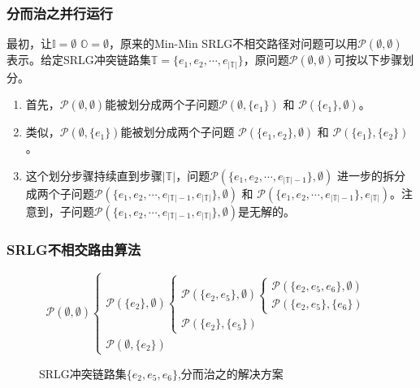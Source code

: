 \begin{frame}
\frametitle{分而治之并行运行}
最初，让$\mathbb{I}=\emptyset$ ${\mathbb{O}}=\emptyset$，原来的Min-Min SRLG不相交路径对问题可以用$\mathcal{P}(\emptyset,\emptyset)$ 表示。给定SRLG冲突链路集$\mathbb{T}=\{{e_1},{e_2}, \cdots ,{e_{\left| \mathbb{T} \right|}}\}$，原问题$\mathcal{P}(\emptyset,\emptyset)$可按以下步骤划分。

\begin{enumerate}
  \item 首先，$\mathcal{P}(\emptyset,\emptyset)$能被划分成两个子问题$\mathcal{P}(\emptyset,\{e_1\})$ 和 $\mathcal{P}(\{e_1\},\emptyset)$。
  \item 类似，$\mathcal{P}(\emptyset,\{e_1\})$能被划分成两个子问题 $\mathcal{P}(\{e_1,e_2\},\emptyset)$ 和 $\mathcal{P}(\{e_1\},\{e_2\})$。
  \item 这个划分步骤持续直到步骤$|\mathbb{T}|$，问题$\mathcal{P}(\{e_1,e_2,\cdots ,{e_{\left| \mathbb{T} \right|-1}}\},\emptyset)$ 进一步的拆分成两个子问题$\mathcal{P}(\{e_1,e_2,\cdots ,{e_{\left| \mathbb{T} \right|-1}}, {e_{\left| \mathbb{T} \right|}}\},\emptyset)$ 和 $\mathcal{P}(\{e_1,e_2,\cdots ,{e_{\left| \mathbb{T} \right|-1}}\},{e_{\left| \mathbb{T} \right|}})$。注意到，子问题$\mathcal{P}(\{e_1,e_2,\cdots ,{e_{\left| \mathbb{T} \right|-1}}, {e_{\left| \mathbb{T} \right|}}\},\emptyset)$是无解的。
\end{enumerate}

\end{frame}
\begin{frame}
\frametitle{SRLG不相交路由算法}
\begin{figure}[htbp]
\large{
\begin{equation*}
{\mathcal P}(\emptyset ,\emptyset )\left\{ {\begin{array}{*{20}{l}}
{{\mathcal P}(\{ e_2\} ,\emptyset )\left\{ {\begin{array}{*{20}{l}}
{{\mathcal P}(\{ e_2,e_5\} ,\emptyset )\left\{ {\begin{array}{*{20}{l}}
{{\mathcal P}(\{ e_2,e_5,e_6\} ,\emptyset )}\\
{\boxed{{\mathcal P}(\{ e_2,e_5\} ,\{ e_6\} )}}
\end{array}} \right.}\\
{\boxed{{\mathcal P}(\{ e_2\} ,\{ e_5\} )}}
\end{array}} \right.}\\
{\boxed{{\mathcal P}(\emptyset ,\{ e_2\} )}}
\end{array}} \right.
\end{equation*}
}
\caption{SRLG冲突链路集$\{ e_2,e_5,e_6\}$,分而治之的解决方案}
\label{fig:DividedConquer}
\end{figure}
\end{frame}

